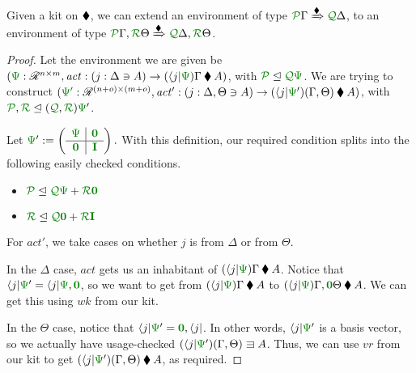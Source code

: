 \documentclass[submission,copyright,creativecommons]{eptcs}
\begin{document}
\begin{lemma}[bind]\label{lem:bind}
  Given a kit on $\mathbin{\blacklozenge}$, we can extend an environment of type
  $\ctx{\Gamma}{P} \subst{\kitrel} \ctx{\Delta}{Q}$, to an environment of type
  $\ctx{\Gamma}{P}, \ctx{\Theta}{R} \subst{\kitrel}
  \ctx{\Delta}{Q}, \ctx{\Theta}{R}$.
\end{lemma}
\begin{proof}
  Let the environment we are given be
  $(\rescomment\Psi : \mathscr R^{n \times m},
  \mathit{act} : (j : \Delta \ni A) \to (\langle j \rvert\rescomment\Psi)\Gamma \kitrel A)$,
  with $\resctx P \subres \resctx Q \rescomment\Psi$.
  We are trying to construct
  $(\rescomment{\Psi'} : \mathscr R^{(n + o) \times (m + o)},
  \mathit{act'} : (j : \Delta, \Theta \ni A) \to
  (\langle j \rvert\rescomment\Psi')(\Gamma, \Theta) \kitrel A)$,
  with $\resctx P, \resctx R \subres (\resctx Q, \resctx R) \rescomment\Psi'$.

  Let \(
    \rescomment\Psi' := \left(\begin{array}{c|c}
                                \rescomment\Psi & \rescomment{\mat 0}
                                \\ \hline
                                \rescomment{\mat 0} & \rescomment{\mat I}
                              \end{array}\right).
  \)
  With this definition, our required condition splits into the following easily
  checked conditions.
  \begin{itemize}
    \item
      $\resctx P \subres
      \resctx Q\rescomment\Psi + \resctx R\rescomment{\mat 0}$
    \item
      $\resctx R \subres
      \resctx Q\rescomment{\mat 0} + \resctx R\rescomment{\mat I}$
  \end{itemize}

  For $\mathit{act'}$, we take cases on whether $j$ is from $\Delta$ or from
  $\Theta$.

  In the $\Delta$ case, $\mathit{act}$ gets us an inhabitant of
  $(\langle j \rvert\rescomment\Psi)\Gamma \kitrel A$.
  Notice that
  $\langle j \rvert\rescomment\Psi' =
  \langle j \rvert\rescomment\Psi, \rescomment{\vct 0}$,
  so we want to get from $(\langle j \rvert\rescomment\Psi)\Gamma \kitrel A$ to
  $(\langle j \rvert\rescomment\Psi)\Gamma, \rescomment{\vct 0}\Theta
  \kitrel A$.
  We can get this using $\mathit{wk}$ from our kit.

  In the $\Theta$ case, notice that
  $\langle j \rvert\rescomment\Psi' = \rescomment{\vct 0}, \langle j \rvert$.
  In other words, $\langle j \rvert\rescomment\Psi'$ is a basis vector, so we
  actually have usage-checked
  $(\langle j \rvert\rescomment\Psi')(\Gamma, \Theta) \lvar A$.
  Thus, we can use $\mathit{vr}$ from our kit to get
  $(\langle j \rvert\rescomment\Psi')(\Gamma, \Theta) \kitrel A$, as required.
\end{proof}
\end{document}
